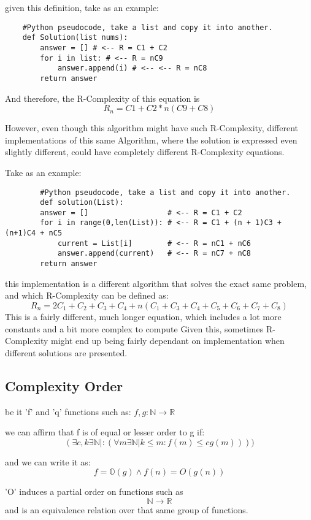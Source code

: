\documentclass[12pt,a4paper,olive]{bbe}
\begin{document}
	given this definition, take as an example: 
	\bigskip
	\bigskip

	\begin{verbatim}
	#Python pseudocode, take a list and copy it into another.
	def Solution(list nums): 
	    answer = [] # <-- R = C1 + C2
	    for i in list: # <-- R = nC9
	        answer.append(i) # <-- <-- R = nC8 
	    return answer
	\end{verbatim}

	And therefore, the R-Complexity of this equation is $$R_n=C1+C2*n(C9+C8)$$ 

	However, even though this algorithm might have such R-Complexity, different implementations of this 
	same Algorithm, where the solution is expressed even slightly different, could have completely different
	R-Complexity equations.

	Take as an example:
	\begin{verbatim}
		#Python pseudocode, take a list and copy it into another.
		def solution(List): 
		answer = [] 				 # <-- R = C1 + C2
		for i in range(0,len(List)): # <-- R = C1 + (n + 1)C3 + (n+1)C4 + nC5
		    current = List[i]		 # <-- R = nC1 + nC6
		    answer.append(current)   # <-- R = nC7 + nC8
		return answer
	\end{verbatim}

	this implementation is a different algorithm that solves the exact same problem, and which R-Complexity can be
	defined as:
	$$ R_n = 2C_1 + C_2 + C_3 + C_4 + n(C_1 + C_3 + C_4 + C_5 + C_6+ C_7+ C_8) $$
	This is a fairly different, much longer equation, which includes a lot more constants and a bit more complex to compute
	Given this, sometimes R-Complexity might end up being fairly dependant on implementation when different solutions are presented.
	\subsection{Complexity Order}
	be it 'f' and 'q' functions such as: $f,g : \mathbb{N} \rightarrow \mathbb{R}$

	we can affirm that f is of equal or lesser order to g if:
	$$ ( \exists c, k \exists \mathbb{N} |: (\forall m \exists \mathbb{N} | k \le m : f(m) \le cg(m) ) ))$$

	and we can write it as: 
	$$f = \mathbb{O}(g) \land f(n) = O(g(n))$$
	
	'O' induces a partial order on functions such as $$\mathbb{N} \rightarrow \mathbb{R}$$ and 
	is an equivalence relation over that same group of functions. 
\end{document}

